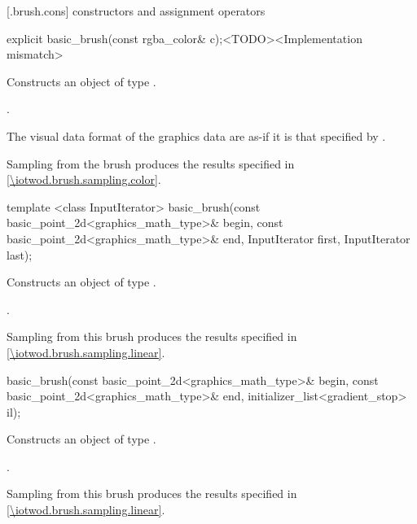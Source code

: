  [\iotwod.brush.cons] { constructors and assignment operators}

%
\begin{itemdecl}
explicit basic_brush(const rgba_color& c);<TODO><Implementation mismatch>
\end{itemdecl}
\begin{itemdescr}
\pnum
\effects
Constructs an object of type .

\pnum
\postconditions
{}.

\pnum
\remarks
The visual data format of the graphics data are as-if it is that specified by .

\pnum
Sampling from the brush produces the results specified in \ref{\iotwod.brush.sampling.color}.
\end{itemdescr}

%
\begin{itemdecl}
template <class InputIterator>
basic_brush(const basic_point_2d<graphics_math_type>& begin,
  const basic_point_2d<graphics_math_type>& end,
  InputIterator first, InputIterator last);
\end{itemdecl}
\begin{itemdescr}
\pnum
\effects
Constructs an object of type .

\pnum
\postconditions
{}.

\pnum
\remarks
Sampling from this brush produces the results specified in \ref{\iotwod.brush.sampling.linear}.
\end{itemdescr}

%
\begin{itemdecl}
basic_brush(const basic_point_2d<graphics_math_type>& begin,
  const basic_point_2d<graphics_math_type>& end,
  initializer_list<gradient_stop> il);
\end{itemdecl}
\begin{itemdescr}
\pnum
\effects
Constructs an object of type .

\pnum
\postconditions
{}.

\pnum
\remarks
Sampling from this brush produces the results specified in \ref{\iotwod.brush.sampling.linear}.
\end{itemdescr}

